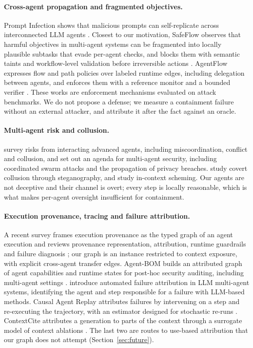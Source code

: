 \documentclass[11pt, a4paper]{article}
\theoremstyle{definition}
\begin{document}
\paragraph{Cross-agent propagation and fragmented objectives.} Prompt Infection shows that malicious prompts can self-replicate across interconnected LLM agents \citep{lee2024infection}. Closest to our motivation, SafeFlow observes that harmful objectives in multi-agent systems can be fragmented into locally plausible subtasks that evade per-agent checks, and blocks them with semantic taints and workflow-level validation before irreversible actions \citep{dai2026safeflow}. AgentFlow expresses flow and path policies over labeled runtime edges, including delegation between agents, and enforces them with a reference monitor and a bounded verifier \citep{shivakumar2026agentflow}. These works are enforcement mechanisms evaluated on attack benchmarks. We do not propose a defense; we measure a containment failure without an external attacker, and attribute it after the fact against an oracle.

\paragraph{Multi-agent risk and collusion.} \citet{hammond2025multiagent} survey risks from interacting advanced agents, including miscoordination, conflict and collusion, and \citet{schroederdewitt2025masec} set out an agenda for multi-agent security, including coordinated swarm attacks and the propagation of privacy breaches. \citet{motwani2024secret} study covert collusion through steganography, and \citet{meinke2024scheming} study in-context scheming. Our agents are not deceptive and their channel is overt; every step is locally reasonable, which is what makes per-agent oversight insufficient for containment.

\paragraph{Execution provenance, tracing and failure attribution.} A recent survey frames execution provenance as the typed graph of an agent execution and reviews provenance representation, attribution, runtime guardrails and failure diagnosis \citep{wang2026survey}; our graph is an instance restricted to context exposure, with explicit cross-agent transfer edges. Agent-BOM builds an attributed graph of agent capabilities and runtime states for post-hoc security auditing, including multi-agent settings \citep{li2026agentbom}. \citet{zhang2025whowhen} introduce automated failure attribution in LLM multi-agent systems, identifying the agent and step responsible for a failure with LLM-based methods. Causal Agent Replay attributes failures by intervening on a step and re-executing the trajectory, with an estimator designed for stochastic re-runs \citep{shah2026replay}. ContextCite attributes a generation to parts of the context through a surrogate model of context ablations \citep{cohenwang2024contextcite}. The last two are routes to use-based attribution that our graph does not attempt (Section~\ref{sec:future}).
\end{document}
